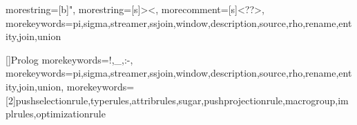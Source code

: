 \usepackage{listings}



{
  morestring=[b]",
  morestring=[s]{>}{<},
  morecomment=[s]{<?}{?>},
  morekeywords={pi,sigma,streamer,ssjoin,window,description,source,rho,rename,entity,join,union}%
}

[]{Prolog}{
   morekeywords={!,\_,:-},
   morekeywords={pi,sigma,streamer,ssjoin,window,description,source,rho,rename,entity,join,union},%
   morekeywords=[2]{pushselectionrule,typerules,attribrules,sugar,pushprojectionrule,macrogroup,implrules,optimizationrule}
}
